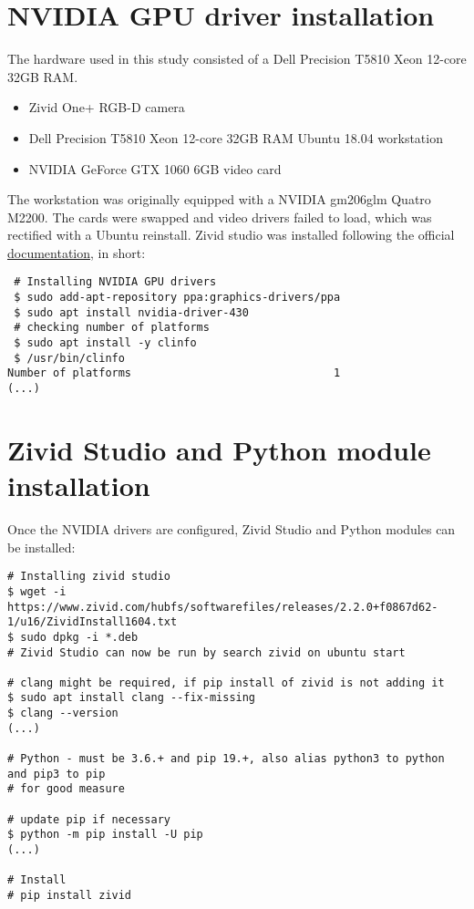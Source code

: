 \section{NVIDIA GPU driver installation}

The hardware used in this study consisted of a Dell Precision T5810 Xeon 12-core 32GB RAM.
\begin{itemize}
    \item Zivid One+ RGB-D camera
    \item Dell Precision T5810 Xeon 12-core 32GB RAM Ubuntu 18.04 workstation
    \item NVIDIA GeForce GTX 1060 6GB video card
\end{itemize}

The workstation was originally equipped with a NVIDIA gm206glm Quatro M2200. The cards were swapped and video drivers failed to load, which was rectified with a Ubuntu reinstall.
Zivid studio was installed following the official \href{https://zivid.atlassian.net/wiki/spaces/ZividKB/pages/59080712/Zivid+Software+Installation}{documentation}, in short:
\begin{verbatim}
 # Installing NVIDIA GPU drivers
 $ sudo add-apt-repository ppa:graphics-drivers/ppa
 $ sudo apt install nvidia-driver-430
 # checking number of platforms
 $ sudo apt install -y clinfo
 $ /usr/bin/clinfo
Number of platforms                               1
(...)
\end{verbatim}

\section{Zivid Studio and Python module installation}
Once the NVIDIA drivers are configured, Zivid Studio and Python modules can be installed:
\begin{verbatim}
# Installing zivid studio
$ wget -i https://www.zivid.com/hubfs/softwarefiles/releases/2.2.0+f0867d62-1/u16/ZividInstall1604.txt
$ sudo dpkg -i *.deb
# Zivid Studio can now be run by search zivid on ubuntu start 

# clang might be required, if pip install of zivid is not adding it
$ sudo apt install clang --fix-missing
$ clang --version
(...)

# Python - must be 3.6.+ and pip 19.+, also alias python3 to python and pip3 to pip 
# for good measure

# update pip if necessary
$ python -m pip install -U pip
(...)

# Install
# pip install zivid    
\end{verbatim}

